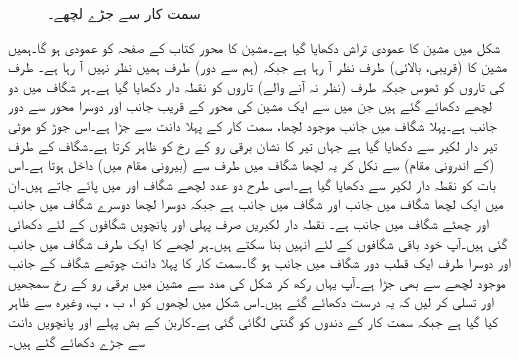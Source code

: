 \begin{figure}
\caption{سمت کار سے جڑے لچھے۔}
\label{شکل_یکسمتی_سمتکار_سے_جڑے_لچھے}
\end{figure}


شکل  میں مشین کا عمودی تراش دکھایا گیا ہے۔مشین کا محور کتاب کے صفحہ کو عمودی ہو گا۔ہمیں مشین کا (قریبی، بالائی)    طرف نظر آ رہا ہے جبکہ  (ہم سے دور)   طرف ہمیں نظر نہیں آ رہا ہے۔ طرف کی تاروں کو ٹھوس جبکہ  طرف (نظر نہ آنے والے) تاروں کو نقطہ دار دکھایا گیا ہے۔ہر شگاف میں دو لچھے دکھائے گئے ہیں جن میں سے ایک مشین کی محور کے قریب   جانب اور دوسرا محور سے دور  جانب ہے۔پہلا  شگاف میں  جانب موجود لچھا، سمت کار کے پہلا  دانت سے جڑا ہے۔اس جوڑ کو موٹی تیر دار لکیر سے دکھایا گیا ہے جہاں تیر کا نشان برقی رو کے رخ کو ظاہر کرتا ہے۔شگاف  کے  طرف (کے اندرونی مقام) سے نکل کر یہ لچھا  شگاف  میں  طرف سے (بیرونی مقام میں) داخل ہوتا ہے۔اس بات کو نقطہ دار لکیر سے دکھایا گیا ہے۔اسی طرح دو عدد لچھے شگاف  اور  میں پائے جاتے ہیں۔ان میں ایک لچھا  شگاف   میں  جانب اور شگاف  میں  جانب ہے جبکہ دوسرا لچھا دوسرے شگاف میں   جانب اور چھٹے شگاف میں  جانب ہے۔ نقطہ دار لکیریں صرف پہلی اور پانچویں شگافوں کے لئے دکھائی گئی ہیں۔آپ خود باقی شگافوں کے لئے انہیں بنا سکتے ہیں۔ہر لچھے کا ایک طرف شگاف میں  جانب  اور  دوسرا طرف ایک قطب دور  شگاف میں  جانب  ہو گا۔سمت کار کا  پہلا  دانت چوتھے  شگاف کے  جانب موجود لچھے سے بھی جڑا ہے۔آپ یہاں رکھ کر شکل   کی مدد سے مشین میں برقی رو کے رخ سمجھیں اور تسلی کر لیں کہ یہ درست دکھائے گئے ہیں۔اس شکل میں لچھوں کو ا، ب ، پ، وغیرہ سے ظاہر کیا گیا ہے جبکہ سمت کار کے دندوں کو گنتی لگائی گئی ہے۔کاربن کے بش پہلے اور پانچویں دانت سے جڑے دکھائے گئے ہیں۔

